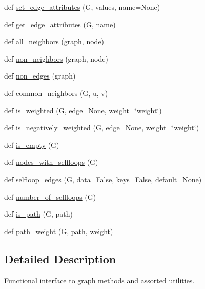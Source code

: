 \begin{DoxyCompactItemize}
def \hyperlink{namespacenetworkx_1_1classes_1_1function_a28b04c05929fa8e2cd0a0acfde1a44a7}{set\+\_\+edge\+\_\+attributes} (G, values, name=None)
\item 
def \hyperlink{namespacenetworkx_1_1classes_1_1function_a05c6ec0a398b8dfc9e3545c54134ce37}{get\+\_\+edge\+\_\+attributes} (G, name)
\item 
def \hyperlink{namespacenetworkx_1_1classes_1_1function_a4e5fbe4b8298af9096b2f41ab421c66f}{all\+\_\+neighbors} (graph, node)
\item 
def \hyperlink{namespacenetworkx_1_1classes_1_1function_a08a939874452e715ec658b8450a874d3}{non\+\_\+neighbors} (graph, node)
\item 
def \hyperlink{namespacenetworkx_1_1classes_1_1function_a35786196acc54b50940475a34415ddfc}{non\+\_\+edges} (graph)
\item 
def \hyperlink{namespacenetworkx_1_1classes_1_1function_ae1b9811bc09def6b6a4e6fda86b49df9}{common\+\_\+neighbors} (G, u, v)
\item 
def \hyperlink{namespacenetworkx_1_1classes_1_1function_a69b85b7c8fc72a2ebc28f739c6364ad4}{is\+\_\+weighted} (G, edge=None, weight=\char`\"{}weight\char`\"{})
\item 
def \hyperlink{namespacenetworkx_1_1classes_1_1function_a9ac6a2e602a81557057e8ba62fb17769}{is\+\_\+negatively\+\_\+weighted} (G, edge=None, weight=\char`\"{}weight\char`\"{})
\item 
def \hyperlink{namespacenetworkx_1_1classes_1_1function_aa66588440e17cb5cbad23b903d9c682e}{is\+\_\+empty} (G)
\item 
def \hyperlink{namespacenetworkx_1_1classes_1_1function_a78924acdc608361a17669da3ebe59b46}{nodes\+\_\+with\+\_\+selfloops} (G)
\item 
def \hyperlink{namespacenetworkx_1_1classes_1_1function_abb46104cf7b33e31d560f74b0d27029f}{selfloop\+\_\+edges} (G, data=False, keys=False, default=None)
\item 
def \hyperlink{namespacenetworkx_1_1classes_1_1function_aa89beffb331b0ed1c2a60df70f3d4f62}{number\+\_\+of\+\_\+selfloops} (G)
\item 
def \hyperlink{namespacenetworkx_1_1classes_1_1function_aadf33b4db2b4b16c70e347646483f6a5}{is\+\_\+path} (G, path)
\item 
def \hyperlink{namespacenetworkx_1_1classes_1_1function_a27237953342bdad7ef82830af11008f7}{path\+\_\+weight} (G, path, weight)
\end{DoxyCompactItemize}


\subsection{Detailed Description}
\begin{DoxyVerb}Functional interface to graph methods and assorted utilities.
\end{DoxyVerb}
 

